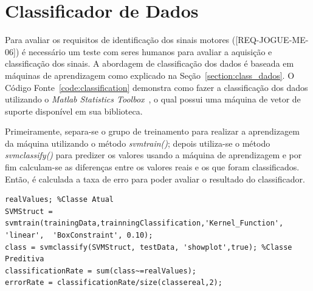 \section{Classificador de Dados}
Para avaliar os requisitos de identificação dos sinais motores ([REQ-JOGUE-ME-06]) é necessário um teste com seres humanos para avaliar a aquisição e classificação dos sinais. A abordagem de classificação dos dados é baseada em máquinas de aprendizagem como explicado na Seção~\ref{section:class_dados}. O Código Fonte~\ref{code:classification} demonstra como fazer a classificação dos dados utilizando o \textit{Matlab Statistics Toolbox}~\cite{matlab2011}, o qual possui uma máquina de vetor de suporte disponível em sua biblioteca.

Primeiramente, separa-se o grupo de treinamento para realizar a aprendizagem da máquina utilizando o método \textit{svmtrain()}; depois utiliza-se o método \textit{svmclassify()} para predizer os valores usando a máquina de aprendizagem  e por fim calculam-se as diferenças entre os valores reais e os que foram classificados. Então, é calculada a taxa de erro para poder avaliar o resultado do classificador.

\begin{lstlisting}[frame=single, caption=Uso de Máquina de Vetor de Suporte para Classificação dos Dados, label=code:classification]
realValues; %Classe Atual
SVMStruct = svmtrain(trainingData,trainningClassification,'Kernel_Function', 'linear',	'BoxConstraint', 0.10);
class = svmclassify(SVMStruct, testData, 'showplot',true); %Classe Preditiva
classificationRate = sum(class~=realValues);
errorRate = classificationRate/size(classereal,2);
\end{lstlisting}
